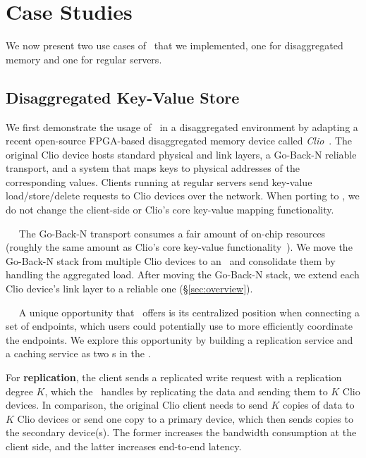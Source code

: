 \section{Case Studies}
\label{sec:application}

We now present two use cases of \snic\ that we implemented, one for disaggregated memory and one for regular servers.

\subsection{Disaggregated Key-Value Store}
\label{sec:kvstore}
We first demonstrate the usage of \snic\ in a disaggregated environment by adapting a
recent open-source FPGA-based disaggregated memory device called {\em Clio}~\cite{Clio}.
The original Clio device hosts standard physical and link layers, a Go-Back-N reliable transport, and a system that maps keys to physical addresses of the corresponding values.
Clients running at regular servers send key-value load/store/delete requests to Clio devices over the network.
When porting to \snic, we do not change the client-side or Clio's core key-value mapping functionality.

~~
The Go-Back-N transport consumes a fair amount of on-chip resources %
(roughly the same amount as Clio's core key-value functionality~\cite{clio-arxiv}).
We move the Go-Back-N stack from multiple Clio devices to an \snic\ and consolidate them by handling the aggregated load.
After moving the Go-Back-N stack, we extend each Clio device's link layer to a reliable one (\S\ref{sec:overview}).

~~
A unique opportunity that \snic\ offers is its centralized position when connecting a set of endpoints, which users could potentially use to more efficiently coordinate the endpoints.
We explore this opportunity by building a replication service and a caching service as two \nt{}s in the \snic.

For \textbf{replication}, the client sends a replicated write request with a replication degree $K$, which the \snic\ handles by replicating the data and sending them to $K$ Clio devices. 
In comparison, the original Clio client needs to send $K$ copies of data to $K$ Clio devices or send one copy to a primary device, which then sends copies to the secondary device(s).
The former increases the bandwidth consumption at the client side, and the latter increases end-to-end latency.

